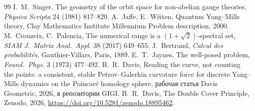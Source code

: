 \begin{thebibliography}{99}
 I.~M.~Singer, The geometry of the orbit space for non-abelian gauge theories, \emph{Physica Scripta} 24 (1981) 817--820.
 A.~Jaffe, E.~Witten, Quantum Yang--Mills theory, Clay Mathematics Institute Millennium Problem description, 2000.
 M.~Crouzeix, C.~Palencia, The numerical range is a $(1+\sqrt2)$-spectral set, \emph{SIAM J.\ Matrix Anal.\ Appl.} 38 (2017) 649--655.
 J.~Bertrand, \emph{Calcul des probabilit\'es}, Gauthier-Villars, Paris, 1889.
 E.~T.~Jaynes, The well-posed problem, \emph{Found.\ Phys.} 3 (1973) 477--492.
 B.~R.~Davis, Reading the curve, not counting the points: a consistent,
stable Petrov--Galerkin curvature force for discrete Yang--Mills dynamics on the Poincar\'e
homology sphere, рабочая статья Davis Geometric, 2026,
 в репозитории GIGI.
 B.~R.~Davis, The Double Cover Principle, Zenodo, 2026, \url{https://doi.org/10.5281/zenodo.18895462}.
\end{thebibliography}

